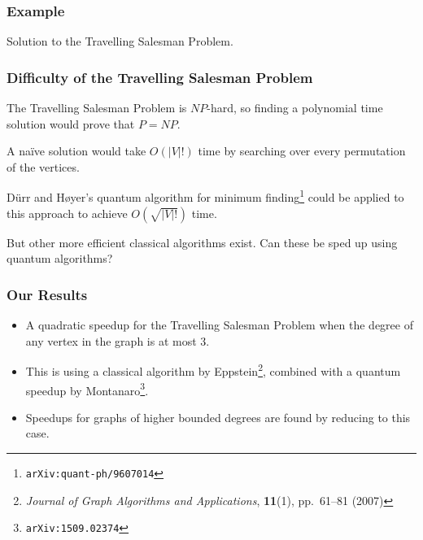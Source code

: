 \documentclass[]{beamer}
\begin{document}
\begin{frame}
\frametitle{Example}
\begin{center}

 Solution to the Travelling Salesman Problem.
\end{center}
\end{frame}

\begin{frame}
\frametitle{Difficulty of the Travelling Salesman Problem}
The Travelling Salesman Problem is $NP$-hard, so finding a polynomial time solution would prove that $P = NP$.

A na\"ive solution would take $O(|V|!)$ time by searching over every permutation of the vertices.

D\"urr and H\o yer's quantum algorithm for minimum finding\footnote{{\tt arXiv:quant-ph/9607014}} could be applied to this approach to achieve $O(\sqrt{|V|!})$ time.

But other more efficient classical algorithms exist. Can these be sped up using quantum algorithms?
\end{frame}

\begin{frame}
\frametitle{Our Results}
\begin{itemize}
\item A quadratic speedup for the Travelling Salesman Problem when the degree of any vertex in the graph is at most $3$.
\item This is using a classical algorithm by Eppstein\footnote{{\em Journal of Graph Algorithms and Applications}, {\bf 11}(1), pp.\ 61--81 (2007)}, combined with a quantum speedup by Montanaro\footnote{{\tt arXiv:1509.02374}}.
\item Speedups for graphs of higher bounded degrees are found by reducing to this case.
\end{itemize}
\end{frame}
\end{document}
